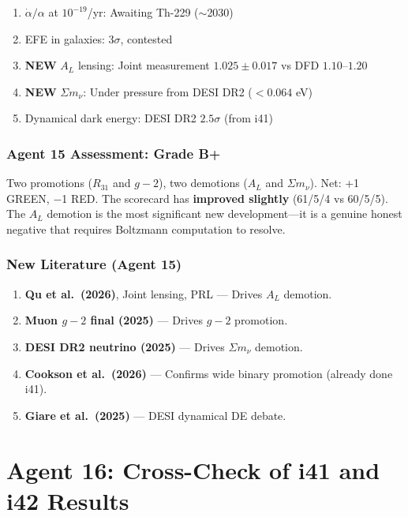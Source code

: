 \documentclass[11pt,a4paper]{article}
\newcommand{\NEW}{\textcolor{dfdblue}{\textbf{NEW}}}
\begin{document}
\begin{enumerate}
\item $\dot{\alpha}/\alpha$ at $10^{-19}$/yr: Awaiting Th-229 ($\sim$2030)
\item EFE in galaxies: $3\sigma$, contested
\item \NEW{} $A_L$ lensing: Joint measurement $1.025 \pm 0.017$ vs DFD $1.10$--$1.20$
\item \NEW{} $\Sigma m_\nu$: Under pressure from DESI DR2 ($< 0.064$ eV)
\item Dynamical dark energy: DESI DR2 $2.5\sigma$ (from i41)
\end{enumerate}

\section{Agent 15 Assessment: Grade B+}

Two promotions ($R_{31}$ and $g-2$), two demotions ($A_L$ and $\Sigma m_\nu$). Net: +1 GREEN, $-$1 RED. The scorecard has \textbf{improved slightly} (61/5/4 vs 60/5/5). The $A_L$ demotion is the most significant new development---it is a genuine honest negative that requires Boltzmann computation to resolve.

\section{New Literature (Agent 15)}

\begin{enumerate}
\item \textbf{Qu et al.\ (2026)}, Joint lensing, PRL --- Drives $A_L$ demotion.
\item \textbf{Muon $g-2$ final (2025)} --- Drives $g-2$ promotion.
\item \textbf{DESI DR2 neutrino (2025)} --- Drives $\Sigma m_\nu$ demotion.
\item \textbf{Cookson et al.\ (2026)} --- Confirms wide binary promotion (already done i41).
\item \textbf{Giare et al.\ (2025)} --- DESI dynamical DE debate.
\end{enumerate}


\part{Agent 16: Cross-Check of i41 and i42 Results}
\label{part:agent16}
\end{document}
